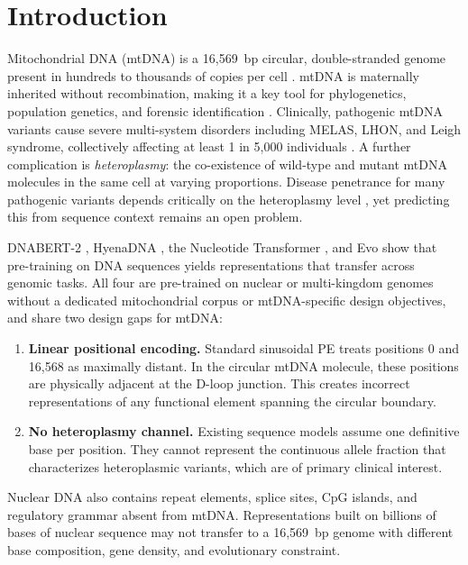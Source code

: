 \documentclass[10pt]{article}
\begin{document}
\section{Introduction}

Mitochondrial DNA (mtDNA) is a 16,569~bp circular, double-stranded genome present in hundreds to
thousands of copies per cell \citep{anderson1981sequence}. mtDNA is maternally inherited without
recombination, making it a key tool for phylogenetics, population genetics, and forensic
identification \citep{vanoven2009phylotree}. Clinically, pathogenic mtDNA variants cause severe
multi-system disorders including MELAS, LHON, and Leigh syndrome, collectively affecting at least
1 in 5,000 individuals \citep{dimauro2003mitochondrial}. A further complication is
\textit{heteroplasmy}: the co-existence of wild-type and mutant mtDNA molecules in the same cell
at varying proportions. Disease penetrance for many pathogenic variants depends critically on the
heteroplasmy level \citep{stewart2015heteroplasmy}, yet predicting this from sequence context
remains an open problem.

DNABERT-2 \citep{zhou2024dnabert2}, HyenaDNA \citep{nguyen2023hyenadna}, the Nucleotide
Transformer \citep{dallatorre2023nucleotidetransformer}, and Evo \citep{nguyen2024evo} show that
pre-training on DNA sequences yields representations that transfer across genomic tasks. All four
are pre-trained on nuclear or multi-kingdom genomes without a dedicated mitochondrial corpus
or mtDNA-specific design objectives, and share two design gaps for mtDNA:

\begin{enumerate}
\item \textbf{Linear positional encoding.} Standard sinusoidal PE \citep{vaswani2017attention}
treats positions 0 and 16,568 as maximally distant. In the circular mtDNA molecule, these
positions are physically adjacent at the D-loop junction. This creates incorrect representations
of any functional element spanning the circular boundary.

\item \textbf{No heteroplasmy channel.} Existing sequence models assume one definitive base per
position. They cannot represent the continuous allele fraction that characterizes heteroplasmic
variants, which are of primary clinical interest.
\end{enumerate}

Nuclear DNA also contains repeat elements, splice sites, CpG islands, and regulatory grammar
absent from mtDNA. Representations built on billions of bases of nuclear sequence may not
transfer to a 16,569~bp genome with different base composition, gene density, and evolutionary
constraint.
\end{document}
